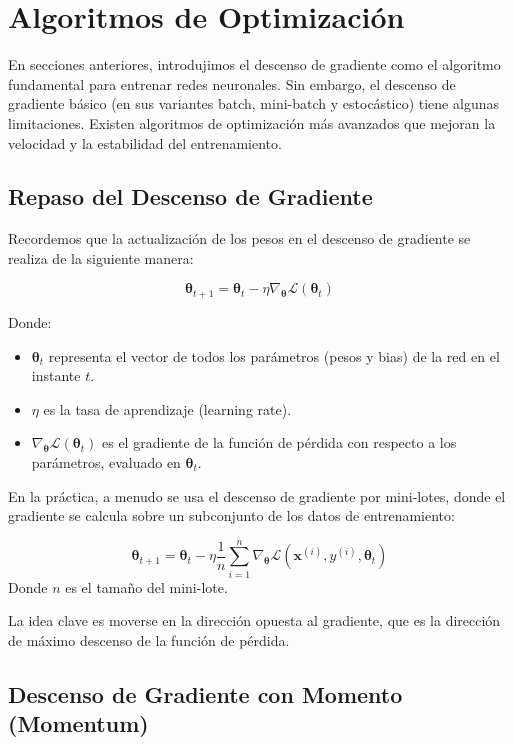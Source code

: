 \documentclass{article}
\begin{document}
\section{Algoritmos de Optimización}

En secciones anteriores, introdujimos el descenso de gradiente como el algoritmo fundamental para entrenar redes neuronales.  Sin embargo, el descenso de gradiente básico (en sus variantes batch, mini-batch y estocástico) tiene algunas limitaciones.  Existen algoritmos de optimización más avanzados que mejoran la velocidad y la estabilidad del entrenamiento.

\subsection{Repaso del Descenso de Gradiente}

Recordemos que la actualización de los pesos en el descenso de gradiente se realiza de la siguiente manera:

\[
\boldsymbol{\theta}_{t+1} = \boldsymbol{\theta}_t - \eta \nabla_{\boldsymbol{\theta}} \mathcal{L}(\boldsymbol{\theta}_t)
\]

Donde:

\begin{itemize}
    \item \(\boldsymbol{\theta}_t\) representa el vector de todos los parámetros (pesos y bias) de la red en el instante \(t\).
    \item \(\eta\) es la tasa de aprendizaje (learning rate).
    \item \(\nabla_{\boldsymbol{\theta}} \mathcal{L}(\boldsymbol{\theta}_t)\) es el gradiente de la función de pérdida con respecto a los parámetros, evaluado en \(\boldsymbol{\theta}_t\).
\end{itemize}

En la práctica, a menudo se usa el descenso de gradiente por mini-lotes, donde el gradiente se calcula sobre un subconjunto de los datos de entrenamiento:

\[
\boldsymbol{\theta}_{t+1} = \boldsymbol{\theta}_t - \eta \frac{1}{n} \sum_{i=1}^{n} \nabla_{\boldsymbol{\theta}} \mathcal{L}(\mathbf{x}^{(i)}, y^{(i)}, \boldsymbol{\theta}_t)
\]
Donde \(n\) es el tamaño del mini-lote.

La idea clave es moverse en la dirección opuesta al gradiente, que es la dirección de máximo descenso de la función de pérdida.

\subsection{Descenso de Gradiente con Momento (Momentum)}
\end{document}
